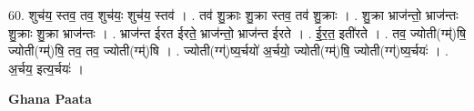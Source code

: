 \documentclass[17pt]{extarticle}
\begin{document}
60. शुच॑य॒ स्तव॒ तव॒ शुच॑यः॒ शुच॑य॒ स्तव॑ । . तव॑ शु॒क्राः शु॒क्रा स्तव॒ तव॑ शु॒क्राः । . शु॒क्रा भ्राज॑न्तो॒ भ्राज॑न्तः शु॒क्राः शु॒क्रा भ्राज॑न्तः । . भ्राज॑न्त ईरत ईरते॒ भ्राज॑न्तो॒ भ्राज॑न्त ईरते । . ई॒र॒त॒ इती॑रते । . तव॒ ज्योती(ग्म्॑)षि॒ ज्योती(ग्म्॑)षि॒ तव॒ तव॒ ज्योती(ग्म्॑)षि । . ज्योती(ग्ग्॑)ष्य॒र्चयो॑ अ॒र्चयो॒ ज्योती(ग्म्॑)षि॒ ज्योती(ग्ग्॑)ष्य॒र्चयः॑ । . अ॒र्चय॒ इत्य॒र्चयः॑ । \newline

\textbf{Ghana Paata } \newline
\end{document}
